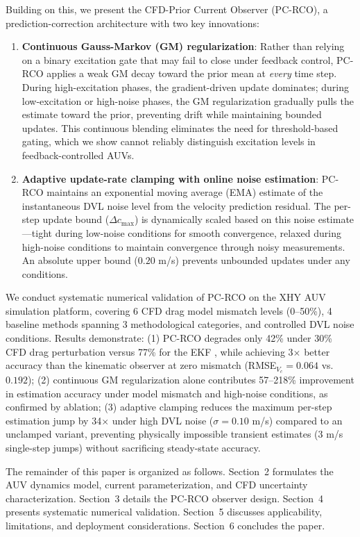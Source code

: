 Building on this, we present the CFD-Prior Current Observer (PC-RCO), a prediction-correction architecture with two key innovations:

\begin{enumerate}[itemsep=0pt,topsep=4pt]
    \item \textbf{Continuous Gauss-Markov (GM) regularization}: Rather than relying on a binary excitation gate that may fail to close under feedback control, PC-RCO applies a weak GM decay toward the prior mean at \emph{every} time step. During high-excitation phases, the gradient-driven update dominates; during low-excitation or high-noise phases, the GM regularization gradually pulls the estimate toward the prior, preventing drift while maintaining bounded updates. This continuous blending eliminates the need for threshold-based gating, which we show cannot reliably distinguish excitation levels in feedback-controlled AUVs.
    \item \textbf{Adaptive update-rate clamping with online noise estimation}: PC-RCO maintains an exponential moving average (EMA) estimate of the instantaneous DVL noise level from the velocity prediction residual. The per-step update bound ($\Delta c_{\max}$) is dynamically scaled based on this noise estimate---tight during low-noise conditions for smooth convergence, relaxed during high-noise conditions to maintain convergence through noisy measurements. An absolute upper bound ($0.20$ m/s) prevents unbounded updates under any conditions.
\end{enumerate}

We conduct systematic numerical validation of PC-RCO on the XHY AUV simulation platform, covering 6 CFD drag model mismatch levels (0--50\%), 4 baseline methods spanning 3 methodological categories, and controlled DVL noise conditions. Results demonstrate: (1) PC-RCO degrades only 42\% under 30\% CFD drag perturbation versus 77\% for the EKF \cite{long2021trajectory}, while achieving 3$\times$ better accuracy than the kinematic observer at zero mismatch (RMSE$_{V_c}=0.064$ vs.\ $0.192$); (2) continuous GM regularization alone contributes 57--218\% improvement in estimation accuracy under model mismatch and high-noise conditions, as confirmed by ablation; (3) adaptive clamping reduces the maximum per-step estimation jump by 34$\times$ under high DVL noise ($\sigma=0.10$ m/s) compared to an unclamped variant, preventing physically impossible transient estimates (3 m/s single-step jumps) without sacrificing steady-state accuracy.

The remainder of this paper is organized as follows. Section~2 formulates the AUV dynamics model, current parameterization, and CFD uncertainty characterization. Section~3 details the PC-RCO observer design. Section~4 presents systematic numerical validation. Section~5 discusses applicability, limitations, and deployment considerations. Section~6 concludes the paper.
